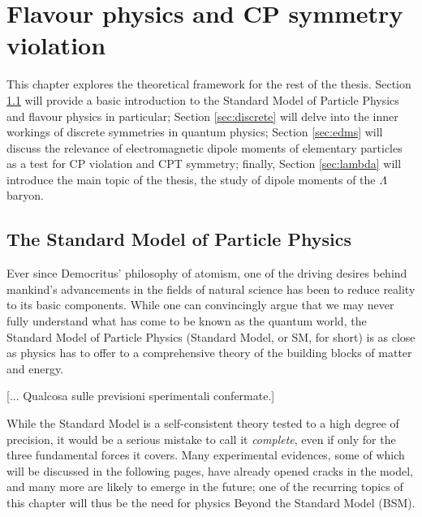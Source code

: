 \chapter{Flavour physics and CP symmetry violation}
This chapter explores the theoretical framework for the rest of the thesis.
Section \ref{sec:sm} will provide a basic introduction to the Standard Model of Particle Physics and flavour physics in particular;
Section \ref{sec:discrete} will delve into the inner workings of discrete symmetries in quantum physics;
Section \ref{sec:edms} will discuss the relevance of electromagnetic dipole moments of elementary particles as a test for CP violation and CPT symmetry;
finally, Section \ref{sec:lambda} will introduce the main topic of the thesis, the study of dipole moments of the $\Lambda$ baryon.

\section{The Standard Model of Particle Physics}
\label{sec:sm}
Ever since Democritus' philosophy of atomism, one of the driving desires behind mankind's advancements in the fields of natural science has been to reduce reality to its basic components.
While one can convincingly argue that we may never fully understand what has come to be known as the quantum world, the Standard Model of Particle Physics (Standard Model, or SM, for short) is as close as physics has to offer to a comprehensive theory of the building blocks of matter and energy.

[... Qualcosa sulle previsioni sperimentali confermate.]

While the Standard Model is a self-consistent theory tested to a high degree of precision, it would be a serious mistake to call it \textit{complete}, even if only for the three fundamental forces it covers.
Many experimental evidences, some of which will be discussed in the following pages, have already opened cracks in the model, and many more are likely to emerge in the future;
one of the recurring topics of this chapter will thus be the need for physics Beyond the Standard Model (BSM).


